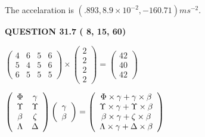 \documentclass[12pt]{article}
\begin{document}
The accelaration is $  %
(
.893,
8.9 \times 10^{-2},
-160.71)
ms^{-2} $.
 
 
 
  
\vspace{0.2in}
  
{\textbf{\Large{QUESTION
31.7 
 (          8,         15,         60)
}}}
  
  
 
 
\noindent{}

 
$\left( \begin{array}{ccccccccccccccc}
           4 & 
           6 & 
           5 & 
           6 \\ 
           5 & 
           4 & 
           5 & 
           6 \\ 
           6 & 
           5 & 
           5 & 
           5
\end{array}\right) \times
\left( \begin{array}{c}
           2 \\ 
           2 \\ 
           2 \\ 
           2
\end{array}\right)  =
\left( \begin{array}{c}
          42 \\ 
          40 \\ 
          42
\end{array}\right)  $
 
$  %
 \left( \begin{array}
 {
 c
 c
 }
 \Phi & 
 \gamma \\ 
 \Upsilon & 
 \Upsilon \\ 
 \beta & 
                    \zeta \\ 
 \Lambda & 
 \Delta
 \end{array} \right)
 \left( \begin{array}
 {
 c
 }
 \gamma \\ 
 \beta
 \end{array} \right)
=
  \left( \begin{array}
 {
 c
 }
 \Phi \times  \gamma   +  \gamma \times  \beta \\ 
 \Upsilon \times  \gamma   +  \Upsilon \times  \beta \\ 
 \beta \times  \gamma   +                     \zeta \times  \beta \\ 
 \Lambda \times  \gamma   +  \Delta \times  \beta
 \end{array} \right)
$
 
\end{document}
